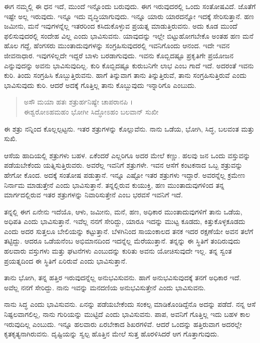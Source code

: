 ಈಗ ನಮ್ಮಲ್ಲಿ ಈ ಧನ ಇದೆ, ಮುಂದೆ ಇನ್ನೊಂದು ಬರುವುದು. ಈಗ ಇರುವುದರಲ್ಲಿ ಒಂದು ಸಂತೋಷವಿದೆ. ಜೊತೆಗೆ ಇಷ್ಟೇ ಅಲ್ಲ ಇರುವುದು. ಇನ್ನೂ ಇದು ವೃದ್ಧಿಯಾಗುವುದು. ಇನ್ನೂ ಯಾರು ಯಾರದನ್ನೋ ಇದಕ್ಕೆ ಸೇರಿಸುತ್ತಾನೆ. ಹಣ ಜಮೀನು, ಮನೆ ಇವುಗಳನ್ನೆಲ್ಲ ಇತರರಿಂದ ಕಸಿದುಕೊಳ್ಳುವ ಪ್ರಯತ್ನ ಮಾಡುತ್ತಿರುವನು. ಅದು ಕೂಡ ಮುಂದೆ ಫಲಿಸುವುದರಲ್ಲಿ ಸಂದೇಹ ವಿಲ್ಲ ಎಂದು ಭಾವಿಸುವನು. ಯಾವುದನ್ನು ಇಲ್ಲೇ ಬಿಟ್ಟುಹೋಗಬೇಕೊ ಅಂತಹ ಹಣ ಮನೆ ಹೊಲ ಗದ್ದೆ, ಹೆಂಗಸರು ಮುಂತಾದುವುಗಳನ್ನು ಸಂಗ್ರಹಿಸುವುದರಲ್ಲಿ ಇವನಿಗೊಂದು ಆನಂದ. ಇದೇ ಇವನ ಜೀವನಾಧಾರ. ಇವುಗಳಿಲ್ಲದೇ ಇದ್ದರೆ ಬಾಳು ಬರಡಾಗುವುದು. ಇವನು ಕೊಬ್ಬಿದಷ್ಟೂ ಪ್ರಕೃತಿಗೇ ಪ್ರಯೋಜನ ಎನ್ನುವುದನ್ನು ಅವನು ಭಾವಿಸುವುದಿಲ್ಲ. ಕುರಿ ಕೊಬ್ಬಿದಷ್ಟೂ ಕುರುಬನಿಗೇ ಲಾಭ ಎಂಬ ಗಾದೆ ಇದೆ. ಅದರಂತೆ ಇವನು ಕುರಿ. ತಿಂದು ಸಂಗ್ರಹಿಸಿ ಕೊಬ್ಬುತ್ತಿರುವನು. ಹಾಗೆ ತಿನ್ನುವಾಗ ತಾನು ತಿನ್ನುತ್ತಿರುವೆ, ತಾನು ಸಂಗ್ರಹಿಸುತ್ತಿರುವೆ ಎಂದು ಭಾವಿಸುವುದು ಕುರಿ. ಆದರೆ ಅದಕ್ಕೆ ಗೊತ್ತಿಲ್ಲ ತಾನು ಕೊಬ್ಬುವುದು ಇನ್ನಾರಿಗೊ ಎಂಬುದು.

\begin{verse}
ಅಸೌ ಮಯಾ ಹತಃ ಶತ್ರುರ್ಹನಿಷ್ಯೇ ಚಾಪರಾನಪಿ ।\\ಈಶ್ವರೋಽಹಮಹಂ ಭೋಗೀ ಸಿದ್ಧೋಽಹಂ ಬಲವಾನ್ ಸುಖೀ 
\end{verse}

{\small ಈ ಶತ್ರು ನನ್ನಿಂದ ಕೊಲ್ಲಲ್ಪಟ್ಟನು. ಇತರ ಶತ್ರುಗಳನ್ನು ಕೊಲ್ಲುವೆನು. ನಾನು ಒಡೆಯ, ಭೋಗಿ, ಸಿದ್ಧ, ಬಲವಂತ ಮತ್ತು ಸುಖಿ.}

ಆಸೆಯ ಹಾದಿಯಲ್ಲಿ ಶತ್ರುಗಳು ಬಹಳ. ಏಕೆಂದರೆ ಎಲ್ಲರಿಗೂ ಅದರ ಮೇಲೆ ಕಣ್ಣು. ಹಲವು ಜನ ಒಂದು ವಸ್ತುವನ್ನು ಪಡೆಯಬೇಕೆಂದು ಯತ್ನಿಸುತ್ತಿರುವರು. ಅವರೆಲ್ಲ ಇವನಿಗೆ ಶತ್ರುಗಳೇ. ಇವನ ಆಸೆಗೆ ಕಂಟಕನಾದ ಒಬ್ಬ ಶತ್ರುವನ್ನು ಹೇಗೋ ಕೊಂದ. ಅದಕ್ಕೆ ಸಂತೋಷ ಪಡುತ್ತಾನೆ. ಇನ್ನೂ ಎಷ್ಟೋ ಇತರ ಶತ್ರುಗಳು ಇದ್ದಾರೆ. ಅವರನ್ನೆಲ್ಲ ಕ್ರಮೇಣ ನಿರ್ನಾಮ ಮಾಡುತ್ತೇನೆ ಎಂದು ಭಾವಿಸುತ್ತಾನೆ. ತನ್ನಲ್ಲಿರುವ ಕುಯುಕ್ತಿ, ಹಣ ಮುಂತಾದುವುಗಳಿಂದ ತನ್ನ ಮಾರ್ಗದಲ್ಲಿರುವ ಇತರ ಶತ್ರುಗಳನ್ನು ನಿವಾರಿಸುತ್ತೇನೆ ಎಂಬ ಭರವಸೆ ಇವನಿಗೆ ಇದೆ.

ತನ್ನಲ್ಲಿ ಈಗ ಏನೇನು ಇದೆಯೊ, ಆಳು, ಜಮೀನು, ಮನೆ, ಹಣ, ಅಧಿಕಾರ ಮುಂತಾದುವುಗಳಿಗೆ ತಾನು ಒಡೆಯ, ಅಧಿಪತಿ ಎಂದು ಭಾವಿಸುತ್ತಾನೆ. ಇವೆಲ್ಲ ನನಗೆ ಸೇರಿದ್ದು, ಯಾರೂ ಇದನ್ನು ಮುಟ್ಟ ಕೂಡದು, ಕಿತ್ತುಕೊಳ್ಳಕೂಡದು ಎಂದು ಅದರ ಸುತ್ತಲೂ ಬೇಲಿಯನ್ನು ಕಟ್ಟುತ್ತಾನೆ. ಬೆಳಗಿನಿಂದ ಸಾಯಂಕಾಲದ ತನಕ ಇದರ ರಕ್ಷಣೆಯೇ ಅವನ ತಲೆಗೆ ತಟ್ಟಿದ್ದು. ಆದರೂ ಒಡೆಯನೆಂಬ ಅಭಿಮಾನದಿಂದ ಇದನ್ನೆಲ್ಲ ಮೆರೆಯುತ್ತಾನೆ. ತನ್ನನ್ನು ಈ ಸ್ಥಿತಿಗೆ ತಂದಿರುವುದು ಹಲವಾರು ವಸ್ತುಗಳು ಮತ್ತು ಘಟನೆಗಳು ಎಂಬುದನ್ನು ಕುರಿತು ಅವನು ಯೋಚಿಸುವುದೇ ಇಲ್ಲ. ತನ್ನ ಸ್ವಂತ ಪ್ರಯತ್ನದಿಂದ ಈ ಸ್ಥಿತಿಗೆ ಏರಿರುವೆ ಎಂದು ಭಾವಿಸುತ್ತಾನೆ.

ತಾನು ಭೋಗಿ, ತನ್ನ ಹತ್ತಿರ ಇರುವುದನ್ನೆಲ್ಲ ಅನುಭವಿಸುವನು. ಹಾಗೆ ಅನುಭವಿಸುವುದಕ್ಕೆ ತನಗೆ ಅಧಿಕಾರ ಇದೆ. ಅವೆಲ್ಲ ನನಗೆ ಸೇರಿದ್ದು. ನಾನು ಇವನ್ನು ಮನದಣಿಯ ಅನುಭವಿಸುತ್ತೇನೆ ಎಂದು ಭಾವಿಸುವನು.

ನಾನು ಸಿದ್ಧ ಎಂದು ಭಾವಿಸುವನು. ಏನನ್ನು ಪಡೆಯಬೇಕೆಂದು ಸಂಕಲ್ಪ ಮಾಡಿಕೊಂಡಿದ್ದೆನೊ ಅದನ್ನು ಪಡೆದೆ. ನನ್ನ ಆಸೆ ನಿಷ್ಫಲವಾಗಲಿಲ್ಲ, ನಾನು ಗುರಿಯನ್ನು ಮುಟ್ಟಿದೆ ಎಂದು ಭಾವಿಸುವನು. ಪಾಪ, ಅವನಿಗೆ ಗೊತ್ತಿಲ್ಲ ಇದು ಬಹಳ ಕಾಲ ಇರುವುದಿಲ್ಲ ಎಂಬುದು. ಇನ್ನೂ ಹಲವಾರು ಏರಬೇಕಾದ ಶಿಖರಗಳಿವೆ. ಆದರೆ ಒಂದನ್ನು ಹತ್ತಿರುವಾಗ ಅದರಲ್ಲೇ ಕೃತಕೃತ್ಯನಾಗಿರುವನು. ದೃಷ್ಟಿಯನ್ನು ಸ್ವಲ್ಪ ಹೊತ್ತಿನ ಮೇಲೆ ಸುತ್ತ ಹೊರಳಿಸಿದರೆ ಆಗ ಗೊತ್ತಾಗುವುದು.

